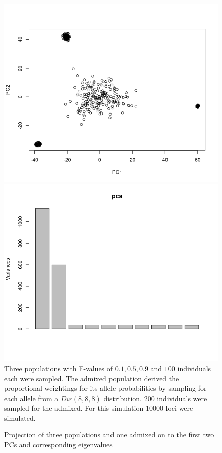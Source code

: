 \documentclass[a4paper, 11pt]{article}
\begin{document}
\begin{figure}[h!]
\centering
\caption{Projection of three populations and one admixed on to the first two PCs and corresponding eigenvalues}
\includegraphics[scale=0.41]{Rplot_projection}
\includegraphics[scale=0.41]{Rplot_eigenvalues}
\\Three populations with F-values  of $0.1, 0.5, 0.9$ and $100$ individuals each were sampled. The admixed population derived the proportional weightings for its allele probabilities by sampling for each allele from a $Dir(8, 8, 8)$ distribution. $200$ individuals were sampled for the admixed. For this simulation $10000$ loci were simulated.
\centering
\end{figure}
\end{document}
